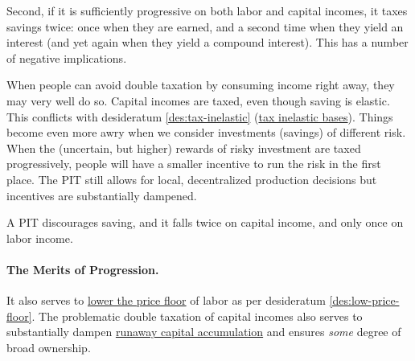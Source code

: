 Second, if it is sufficiently progressive on both labor and capital incomes, it taxes savings twice:
once when they are earned, and a second time when they yield an interest (and yet again when they yield a compound interest).
This has a number of negative implications.

When people can avoid double taxation by consuming income right away, they may very well do so.
Capital incomes are taxed, even though saving is elastic.
This conflicts with desideratum \ref{des:tax-inelastic} (\hyperref[des:tax-inelastic]{tax inelastic bases}).
Things become even more awry when we consider investments (savings) of different risk.
When the (uncertain, but higher) rewards of risky investment are taxed progressively, people will have a smaller incentive to run the risk in the first place.
The PIT still allows for local, decentralized production decisions but incentives are substantially dampened.

A PIT discourages saving, and it falls twice on capital income, and only once on labor income.

\paragraph{The Merits of Progression.}
It also serves to \hyperref[des:low-price-floor]{lower the price floor} of labor as per desideratum \ref{des:low-price-floor}.
The problematic double taxation of capital incomes also serves to substantially dampen \hyperref[sec:inequality-dynamics]{runaway capital accumulation} and ensures \emph{some} degree of broad ownership.

